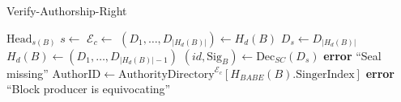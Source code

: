 \begin{algorithm}
\caption{Verify-Authorship-Right}
\begin{algorithmic}
    \require $\text{Head}_{s(B)}$
    \state $s \leftarrow$ 
    \state $\mathcal{E}_c \leftarrow$ 
    \state $(D_1, \ldots, D_{|H_d(B)|}) \leftarrow H_d(B)$
    \state $D_s \leftarrow D_{|H_d(B)|}$
    \state $H_d(B) \leftarrow \left(D_1, \ldots, D_{|H_d(B)| - 1}\right)$
    \state $(id, \text{Sig}_B)\leftarrow \text{Dec}_{SC}(D_s)$
        \state \textbf{error} ``Seal missing''
    \endif
    \state $\text{AuthorID} \leftarrow \text{AuthorityDirectory}^{\mathcal{E}_c}[H_{BABE}(B).\text{SingerIndex}]$
    \state {}
        \state \textbf{error} ``Block producer is equivocating''
    \endif
    \state {}
\end{algorithmic}
\end{algorithm}